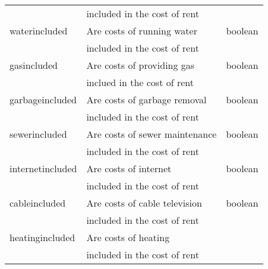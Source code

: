 \documentclass[12pt]{report}
\begin{document}
\begin{longtable}{l l l}
	                                                      & included in the cost of rent                                &                  \\
	waterincluded                                         & Are costs of running water                                  & boolean          \\
	                                                      & included in the cost of rent                                &                  \\
	gasincluded                                           & Are costs of providing gas                                  & boolean          \\
	                                                      & inclued in the cost of rent                                 &                  \\
	garbageincluded                                       & Are costs of garbage removal                                & boolean          \\
	                                                      & included in the cost of rent                                &                  \\
	sewerincluded                                         & Are costs of sewer maintenance                              & boolean          \\
	                                                      & included in the cost of rent                                &                  \\
	internetincluded                                      & Are costs of internet                                       & boolean          \\
	                                                      & included in the cost of rent                                &                  \\
	cableincluded                                         & Are costs of cable television                               & boolean          \\
	                                                      & included in the cost of rent                                &                  \\
	heatingincluded                                       & Are costs of heating                                        &                  \\
	                                                      & included in the cost of rent                                &                  \\

\end{longtable}
\end{document}
